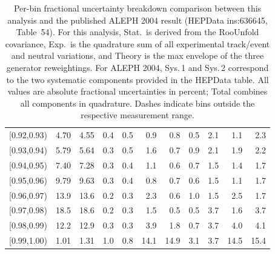 \begin{table}[t!]
{\begin{tabular}{c  r r r r  r r r r  r r}
{[0.92,0.93)} & 4.70 & 4.55 & 0.4 & 0.5 & 0.9 & 0.8 & 0.5 & 2.1 & 1.1 & 2.3 \\
{[0.93,0.94)} & 5.79 & 5.64 & 0.3 & 0.5 & 1.6 & 0.7 & 0.9 & 2.1 & 1.9 & 2.2 \\
{[0.94,0.95)} & 7.40 & 7.28 & 0.3 & 0.4 & 1.1 & 0.6 & 0.7 & 1.5 & 1.4 & 1.7 \\
{[0.95,0.96)} & 9.79 & 9.63 & 0.3 & 0.4 & 0.8 & 0.7 & 0.6 & 1.5 & 1.1 & 1.7 \\
{[0.96,0.97)} & 13.9 & 13.6 & 0.2 & 0.3 & 2.3 & 0.6 & 1.0 & 1.5 & 2.5 & 1.7 \\
{[0.97,0.98)} & 18.5 & 18.6 & 0.2 & 0.3 & 1.5 & 0.5 & 0.5 & 3.7 & 1.6 & 3.7 \\
{[0.98,0.99)} & 12.2 & 12.9 & 0.3 & 0.3 & 3.9 & 1.8 & 0.7 & 3.7 & 4.0 & 4.1 \\
{[0.99,1.00)} & 1.01 & 1.31 & 1.0 & 0.8 & 14.1 & 14.9 & 3.1 & 3.7 & 14.5 & 15.4 \\
\hline
\end{tabular}
}%
\normalsize
\caption{Per-bin fractional uncertainty breakdown comparison between this analysis and the published ALEPH 2004 result (HEPData ins:636645, Table~54). For this analysis, Stat.\ is derived from the RooUnfold covariance, Exp.\ is the quadrature sum of all experimental track/event and neutral variations, and Theory is the max envelope of the three generator reweightings. For ALEPH 2004, Sys.\,1 and Sys.\,2 correspond to the two systematic components provided in the HEPData table. All values are absolute fractional uncertainties in percent; Total combines all components in quadrature. Dashes indicate bins outside the respective measurement range.}
\label{tab:per_bin_uncertainty_breakdown_comparison}
\end{table}
